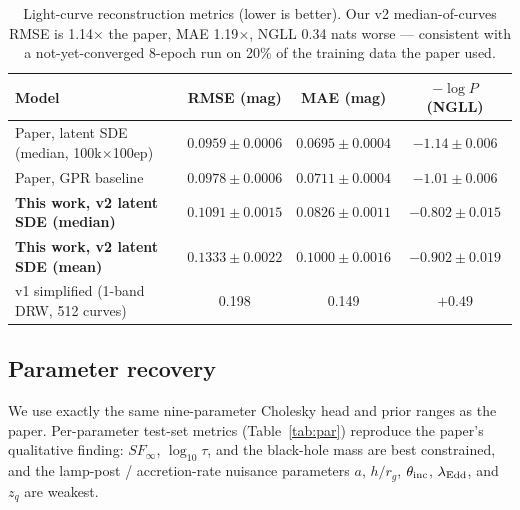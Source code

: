 \documentclass[11pt]{article}
\begin{document}
\begin{table}[h]\centering
\begin{tabular}{lccc}
\toprule
Model & RMSE (mag) & MAE (mag) & $-\log P$ (NGLL)\\
\midrule
Paper, latent SDE (median, 100k$\times$100ep) & $0.0959 \pm 0.0006$ & $0.0695\pm 0.0004$ & $-1.14 \pm 0.006$ \\
Paper, GPR baseline                            & $0.0978 \pm 0.0006$ & $0.0711\pm 0.0004$ & $-1.01 \pm 0.006$ \\
\textbf{This work, v2 latent SDE (median)}     & $\mathbf{0.1091 \pm 0.0015}$ & $\mathbf{0.0826\pm 0.0011}$ & $\mathbf{-0.802\pm 0.015}$ \\
\textbf{This work, v2 latent SDE (mean)}       & $0.1333 \pm 0.0022$ & $0.1000\pm 0.0016$ & $-0.902\pm 0.019$ \\
v1 simplified (1-band DRW, 512 curves)         & 0.198 & 0.149 & $+0.49$ \\
\bottomrule
\end{tabular}
\caption{Light-curve reconstruction metrics (lower is better).  Our v2
  median-of-curves RMSE is 1.14$\times$ the paper, MAE 1.19$\times$,
  NGLL 0.34 nats worse --- consistent with a not-yet-converged 8-epoch run
  on 20\% of the training data the paper used.}
\label{tab:lc}
\end{table}

\subsection{Parameter recovery}
We use exactly the same nine-parameter Cholesky head and prior ranges as
the paper.  Per-parameter test-set metrics (Table~\ref{tab:par}) reproduce
the paper's qualitative finding: $SF_\infty$, $\log_{10}\tau$, and the
black-hole mass are best constrained, and the lamp-post / accretion-rate
nuisance parameters $a$, $h/r_g$, $\theta_{\rm inc}$, $\lambda_{\rm Edd}$,
and $z_q$ are weakest.
\end{document}

